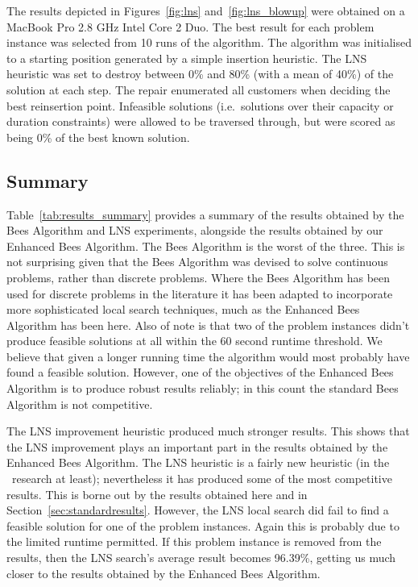 
The results depicted in Figures~\ref{fig:lns} and~\ref{fig:lns_blowup} were obtained on a MacBook Pro 2.8 GHz Intel Core 2 Duo. The best result for each problem instance was selected from 10 runs of the algorithm. The algorithm was initialised to a starting position generated by a simple insertion heuristic. The LNS heuristic was set to destroy between 0\% and 80\% (with a mean of 40\%) of the solution at each step. The repair enumerated all customers when deciding the best reinsertion point. Infeasible solutions (i.e.~solutions over their capacity or duration constraints) were allowed to be traversed through, but were scored as being 0\% of the best known solution.

\subsection{Summary}

Table~\ref{tab:results_summary} provides a summary of the results obtained by the Bees Algorithm and LNS experiments, alongside the results obtained by our Enhanced Bees Algorithm. The Bees Algorithm is the worst of the three. This is not surprising given that the Bees Algorithm was devised to solve continuous problems, rather than discrete problems. Where the Bees Algorithm has been used for discrete problems in the literature it has been adapted to incorporate more sophisticated local search techniques, much as the Enhanced Bees Algorithm has been here. Also of note is that two of the problem instances didn't produce feasible solutions at all within the 60 second runtime threshold. We believe that given a longer running time the algorithm would most probably have found a feasible solution. However, one of the objectives of the Enhanced Bees Algorithm is to produce robust results reliably; in this count the standard Bees Algorithm is not competitive. 

The LNS improvement heuristic produced much stronger results. This shows that the LNS improvement plays an important part in the results obtained by the Enhanced Bees Algorithm. The LNS heuristic is a fairly new heuristic (in the \VRP\ research at least); nevertheless it has produced some of the most competitive results. This is borne out by the results obtained here and in Section~\ref{sec:standardresults}. However, the LNS local search did fail to find a feasible solution for one of the problem instances. Again this is probably due to the limited runtime permitted. If this problem instance is removed from the results, then the LNS search's average result becomes 96.39\%, getting us much closer to the results obtained by the Enhanced Bees Algorithm.

